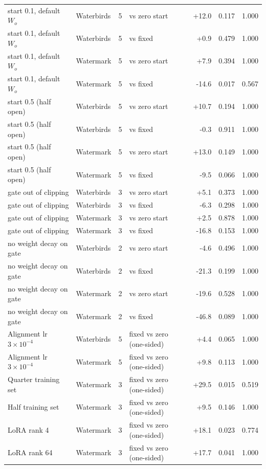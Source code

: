 \documentclass[10pt]{article}
\begin{document}
\begin{longtable}{llrlrrr}
start 0.1, default $W_o$ & Waterbirds & 5 & vs zero start & +12.0 & 0.117 & 1.000 \\
start 0.1, default $W_o$ & Waterbirds & 5 & vs fixed & +0.9 & 0.479 & 1.000 \\
start 0.1, default $W_o$ & Watermark & 5 & vs zero start & +7.9 & 0.394 & 1.000 \\
start 0.1, default $W_o$ & Watermark & 5 & vs fixed & -14.6 & 0.017 & 0.567 \\
start 0.5 (half open) & Waterbirds & 5 & vs zero start & +10.7 & 0.194 & 1.000 \\
start 0.5 (half open) & Waterbirds & 5 & vs fixed & -0.3 & 0.911 & 1.000 \\
start 0.5 (half open) & Watermark & 5 & vs zero start & +13.0 & 0.149 & 1.000 \\
start 0.5 (half open) & Watermark & 5 & vs fixed & -9.5 & 0.066 & 1.000 \\
gate out of clipping & Waterbirds & 3 & vs zero start & +5.1 & 0.373 & 1.000 \\
gate out of clipping & Waterbirds & 3 & vs fixed & -6.3 & 0.298 & 1.000 \\
gate out of clipping & Watermark & 3 & vs zero start & +2.5 & 0.878 & 1.000 \\
gate out of clipping & Watermark & 3 & vs fixed & -16.8 & 0.153 & 1.000 \\
no weight decay on gate & Waterbirds & 2 & vs zero start & -4.6 & 0.496 & 1.000 \\
no weight decay on gate & Waterbirds & 2 & vs fixed & -21.3 & 0.199 & 1.000 \\
no weight decay on gate & Watermark & 2 & vs zero start & -19.6 & 0.528 & 1.000 \\
no weight decay on gate & Watermark & 2 & vs fixed & -46.8 & 0.089 & 1.000 \\
Alignment lr $3\times10^{-4}$ & Waterbirds & 5 & fixed vs zero (one-sided) & +4.4 & 0.065 & 1.000 \\
Alignment lr $3\times10^{-4}$ & Watermark & 5 & fixed vs zero (one-sided) & +9.8 & 0.113 & 1.000 \\
Quarter training set & Watermark & 3 & fixed vs zero (one-sided) & +29.5 & 0.015 & 0.519 \\
Half training set & Watermark & 3 & fixed vs zero (one-sided) & +9.5 & 0.146 & 1.000 \\
LoRA rank 4 & Watermark & 3 & fixed vs zero (one-sided) & +18.1 & 0.023 & 0.774 \\
LoRA rank 64 & Watermark & 3 & fixed vs zero (one-sided) & +17.7 & 0.041 & 1.000 \\
\bottomrule
\end{longtable}
\end{document}
